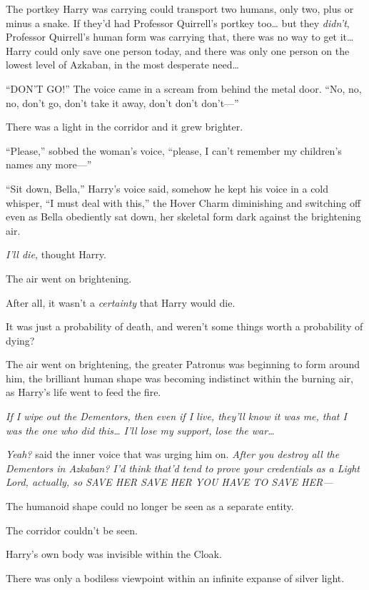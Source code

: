 The portkey Harry was carrying could transport two humans, only two,
plus or minus a snake. If they'd had Professor Quirrell's portkey
too\ldots{} but they \emph{didn't}, Professor Quirrell's human form was
carrying that, there was no way to get it\ldots{} Harry could only save
one person today, and there was only one person on the lowest level of
Azkaban, in the most desperate need\ldots{}

``DON'T GO!'' The voice came in a scream from behind the metal door.
``No, no, no, don't go, don't take it away, don't don't don't---''

There was a light in the corridor and it grew brighter.

``Please,'' sobbed the woman's voice, ``please, I can't remember my
children's names any more---''

``Sit down, Bella,'' Harry's voice said, somehow he kept his voice in a
cold whisper, ``I must deal with this,'' the Hover Charm diminishing and
switching off even as Bella obediently sat down, her skeletal form dark
against the brightening air.

\emph{I'll die,} thought Harry.

The air went on brightening.

After all, it wasn't a \emph{certainty} that Harry would die.

It was just a probability of death, and weren't some things worth a
probability of dying?

The air went on brightening, the greater Patronus was beginning to form
around him, the brilliant human shape was becoming indistinct within the
burning air, as Harry's life went to feed the fire.

\emph{If I wipe out the Dementors, then even if I live, they'll know it
was me, that I was the one who did this\ldots{} I'll lose my support,
lose the war\ldots{}}

\emph{Yeah?} said the inner voice that was urging him on. \emph{After
you destroy all the Dementors in Azkaban? I'd think that'd tend to prove
your credentials as a Light Lord, actually, so SAVE HER SAVE HER YOU
HAVE TO SAVE HER---}

The humanoid shape could no longer be seen as a separate entity.

The corridor couldn't be seen.

Harry's own body was invisible within the Cloak.

There was only a bodiless viewpoint within an infinite expanse of silver
light.

